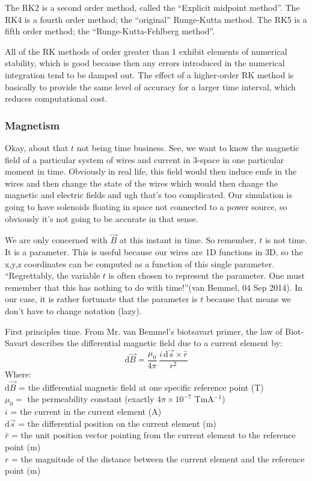 \documentclass[12pt]{article}
\newcommand{\spaces}{\phantom{\qquad}}
\newcommand{\dif}{\mathrm{d}}
\begin{document}
	The RK2 is a second order method, called the ``Explicit midpoint method''.	The RK4 is a fourth order method; the ``original'' Runge-Kutta method. The RK5 is a fifth order method; the ``Runge-Kutta-Fehlberg method''.
	
	All of the RK methods of order greater than 1 exhibit elements of numerical stability, which is good because then any errors introduced in the numerical integration tend to be damped out. The effect of a higher-order RK method is basically to provide the same level of accuracy for a larger time interval, which reduces computational cost. 
	
	\subsubsection*{Magnetism}
	
	Okay, about that $t$ not being time business. See, we want to know the magnetic field of a particular system of wires and current in 3-space in one particular moment in time. Obviously in real life, this field would then induce emfs in the wires and then change the state of the wires which would then change the magnetic and electric fields and ugh that's too complicated. Our simulation is going to have solenoids floating in space not connected to a power source, so obviously it's not going to be accurate in that sense.
	
	We are only concerned with $\vec{B}$ at this instant in time. So remember, $t$ is not time. It is a parameter. This is useful because our wires are 1D functions in 3D, so the x,y,z coordinates can be computed as a function of this single parameter. ``Regrettably, the variable $t$ is often chosen to represent the parameter. One must remember that this has nothing to do with time!''(van Bemmel, 04 Sep 2014). In our case, it is rather fortunate that the parameter is $t$ because that means we don't have to change notation (lazy).
	
	First principles time. From Mr. van Bemmel's biotsavart primer, the law of Biot-Savart describes the differential magnetic field due to a current element by:	
			$$\dif \vec{B} = \frac{\mu_0}{4\pi} \, \frac{i\,\dif \vec{s} \times \hat{r}}{r^2}$$			
	Where: \\
		\spaces $\dif \vec{B}$ = the differential magnetic field at one specific reference point (T) \\
		\spaces $\mu_0 =$ the permeability constant (exactly 4$\pi \times 10^{-7}$ TmA$^{-1}$)\\		
		\spaces $i$ = the current in the current element (A) \\
		\spaces $\dif \vec{s}$ = the differential position on the current element (m) \\
		\spaces $\hat{r}$ = the unit position vector pointing from the current element to the reference point (m)\\
		\spaces $r$ = the magnitude of the distance between the current element and the reference point (m)
			
\end{document}
